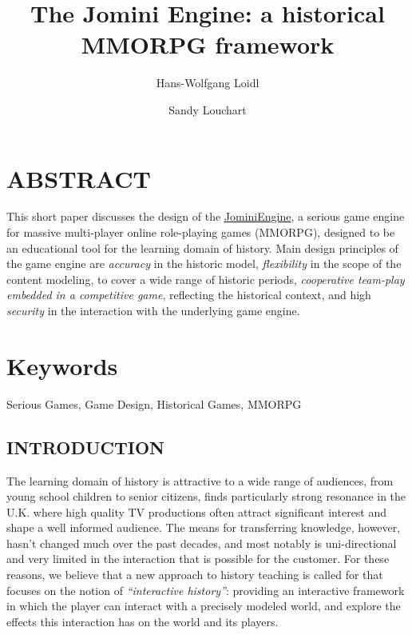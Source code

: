 \documentclass[11pt]{article}
\title{\addvspace{-2\baselineskip}The Jomini Engine: a historical MMORPG framework}
\author{Hans-Wolfgang Loidl}
\affil{
Heriot-Watt University, 
Edinburgh EH144AS \\
\texttt{H.W.Loidl@hw.ac.uk} }
\author{Sandy Louchart}
\affil{
Glasgow School of Arts, 
Glasgow G511EA \\
\texttt{S.Louchart@gsa.ac.uk}}
\date{\vspace{-60pt}}
\begin{document}
\newpage
{}  
   \maketitle
    \copyrightnotice
    
   \section*{ABSTRACT}

   This short paper discusses the design of the \href{http://www.macs.hw.ac.uk/~hwloidl/Projects/JominiEngine/}{JominiEngine}, a serious game engine for
   massive multi-player online role-playing games (MMORPG), designed to be an educational
   tool for the learning domain of history.
   Main design principles of the game engine are
   \emph{accuracy} in the historic model,
   \emph{flexibility} in the scope of the content modeling, to cover a wide range of historic periods,
   \emph{cooperative team-play embedded in a competitive game}, reflecting the  historical context, and
   high \emph{security} in the interaction with the underlying game engine.
   
\section*{Keywords}
Serious Games, Game Design, Historical Games, MMORPG

\subsection*{INTRODUCTION}

The learning domain of history is attractive to a wide range of audiences, from
young school children to senior citizens, finds particularly strong resonance in the
U.K. where high quality TV productions often attract significant interest and shape a
well informed audience. The means for transferring knowledge, however, hasn't changed
much over the past decades, and most notably is uni-directional and very limited in
the interaction that is possible for the customer. For these reasons, we believe that
a new approach to history teaching is called for that focuses on the notion of
\emph{``interactive history''}: providing an interactive framework in which the
player can interact with a precisely modeled world, and explore the effects
this interaction has on the world and its players.
\end{document}
